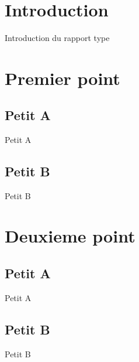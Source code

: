 \documentclass[11pt,a4paper]{article}
\begin{document}

\newpage
{}
\hfill \\

\newpage
\section{Introduction}
	Introduction du rapport type\\
\newpage
\section{Premier point}
	\subsection{Petit A}
	Petit A \\
	\subsection{Petit B}
	Petit B \\
	
\newpage
\section{Deuxieme point}
	\subsection{Petit A}
        Petit A \\
	\newpage
	\subsection{Petit B}
        Petit B \\

\newpage




 
\end{document}
